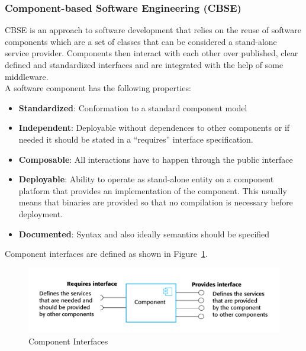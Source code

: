 \subsubsection{Component-based Software Engineering (CBSE)}
CBSE is an approach to software development that relies on the reuse of software components which are a set of classes that can be considered a stand-alone service provider.
Components then interact with each other over published, clear defined and standardized interfaces and are integrated with the help of some middleware.\\
A software component has the following properties:
\begin{itemize}
  \item \textbf{Standardized}: Conformation to a standard component model
  \item \textbf{Independent}: Deployable without dependences to other components or if needed it should be stated in a ``requires'' interface specification.
  \item \textbf{Composable}: All interactions have to happen through the public interface
  \item \textbf{Deployable}: Ability to operate as stand-alone entity on a component platform that provides an implementation of the component. This usually means that binaries are provided so that no compilation is necessary before deployment.
  \item \textbf{Documented}: Syntax and also ideally semantics should be specified
\end{itemize}

Component interfaces are defined as shown in Figure~\ref{fig:component_interfaces}.\\
\begin{figure}[h]
  \centering
  \includegraphics[width=.8\textwidth]{images/component_interfaces.png}
  \caption{Component Interfaces}\label{fig:component_interfaces}
\end{figure}

